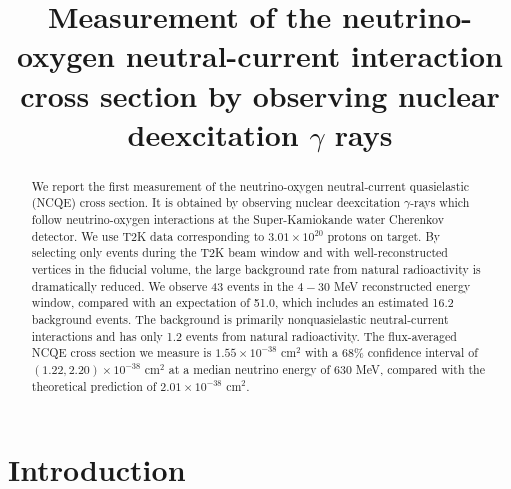 \documentclass[
aps,
prd,
twocolumn,
superscriptaddress,
showpacs
]{revtex4-1}
\begin{document}






\title{Measurement of the neutrino-oxygen neutral-current interaction cross section by observing nuclear deexcitation $\gamma$ rays}


%


\begin{abstract}
We report the first measurement of the neutrino-oxygen neutral-current quasielastic (NCQE) cross section. It is obtained by observing nuclear deexcitation $\gamma$-rays which follow neutrino-oxygen interactions at the Super-Kamiokande water Cherenkov detector. We use T2K data corresponding to $3.01 \times 10^{20}$ protons on target.  By selecting only events during the T2K beam window and with well-reconstructed vertices in the fiducial volume, the large background rate from natural radioactivity is dramatically reduced.  We observe 43 events in the $4-30$ MeV reconstructed energy window, compared with an expectation of 51.0, which includes an estimated 16.2 background events.  The background is primarily nonquasielastic neutral-current interactions and has only 1.2 events from natural radioactivity. The flux-averaged NCQE cross section we measure is $1.55 \times 10^{-38}$ cm$^2$ with a 68\% confidence interval of $(1.22, 2.20) \times 10^{-38}$ cm$^2$ at a median neutrino energy of 630 MeV, compared with the theoretical prediction of $2.01 \times 10^{-38}$ cm$^2$.
\end{abstract}





\maketitle

\section{Introduction}
\end{document}
